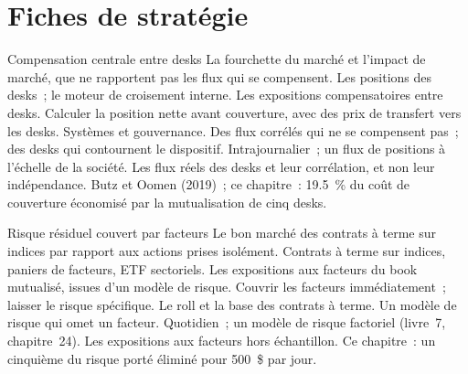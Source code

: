 \section{Fiches de stratégie}

\begin{strategyfile}{Compensation centrale entre desks}\label{strat:s2:the-central-risk-book:netting}
 La fourchette du marché et l'impact de marché, que ne rapportent pas les flux qui se compensent.
 Les positions des desks~; le moteur de croisement interne.
 Les expositions compensatoires entre desks.
 Calculer la position nette avant couverture, avec des prix de transfert vers les desks.
 Systèmes et gouvernance.
 Des flux corrélés qui ne se compensent pas~; des desks qui contournent le dispositif.
 Intrajournalier~; un flux de positions à l'échelle de la société.
 Les flux réels des desks et leur corrélation, et non leur indépendance.
 Butz et Oomen (2019)~; ce chapitre~: 19.5~\% du coût de couverture économisé par la mutualisation de cinq desks.
\end{strategyfile}

\begin{strategyfile}{Risque résiduel couvert par facteurs}\label{strat:s2:the-central-risk-book:factor}
 Le bon marché des contrats à terme sur indices par rapport aux actions prises isolément.
 Contrats à terme sur indices, paniers de facteurs, ETF sectoriels.
 Les expositions aux facteurs du book mutualisé, issues d'un modèle de risque.
 Couvrir les facteurs immédiatement~; laisser le risque spécifique.
 Le roll et la base des contrats à terme.
 Un modèle de risque qui omet un facteur.
 Quotidien~; un modèle de risque factoriel (livre~7, chapitre~24).
 Les expositions aux facteurs hors échantillon.
 Ce chapitre~: un cinquième du risque porté éliminé pour 500~\$ par jour.
\end{strategyfile}


